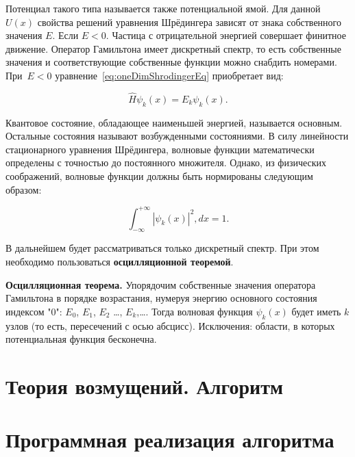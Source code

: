 \documentclass[a4paper,12pt]{article}
\begin{document}
Потенциал такого типа называется также потенциальной ямой.
Для данной $U(x)$ свойства решений уравнения Шрёдингера зависят от знака собственного значения $E$.
Если $E < 0$.
Частица с отрицательной энергией совершает финитное движение.
Оператор Гамильтона имеет дискретный спектр, то есть собственные значения и соответствующие собственные функции можно снабдить номерами.
При~$E < 0$ уравнение~\eqref{eq:oneDimShrodingerEq} приобретает вид\cite{tim_shrod}:

\begin{equation}
    \hat{H}\psi_k(x) = E_k\psi_k(x).
    \label{eq:shrodinger_eq_e_less_0}
\end{equation}

Квантовое состояние, обладающее наименьшей энергией, называется основным.
Остальные состояния называют возбужденными состояниями.
В силу линейности стационарного уравнения Шрёдингера, волновые функции математически определены с точностью до постоянного множителя.
Однако, из физических соображений, волновые функции должны быть нормированы следующим образом:

\begin{equation}
    \int_{-\infty}^{+\infty} |\psi_k(x)|^2, dx = 1.
    \label{eq:wave_func_normalization}
\end{equation}

В дальнейшем будет рассматриваться только дискретный спектр.
При этом необходимо пользоваться \textbf{осцилляционной теоремой}.

\textbf{Осцилляционная теорема.}
Упорядочим собственные значения оператора Гамильтона в порядке возрастания, нумеруя энергию основного состояния индексом "0": $E_0$, $E_1$, $E_2$ \dots, $E_k$,\dots.
Тогда волновая функция $\psi_k(x)$ будет иметь $k$ узлов (то есть, пересечений с осью абсцисс).
Исключения: области, в которых потенциальная функция бесконечна.

\newpage

\section{Теория возмущений. Алгоритм}\label{sec:solve_method}


\newpage

\section{Программная реализация алгоритма}\label{sec:--}

\end{document}
